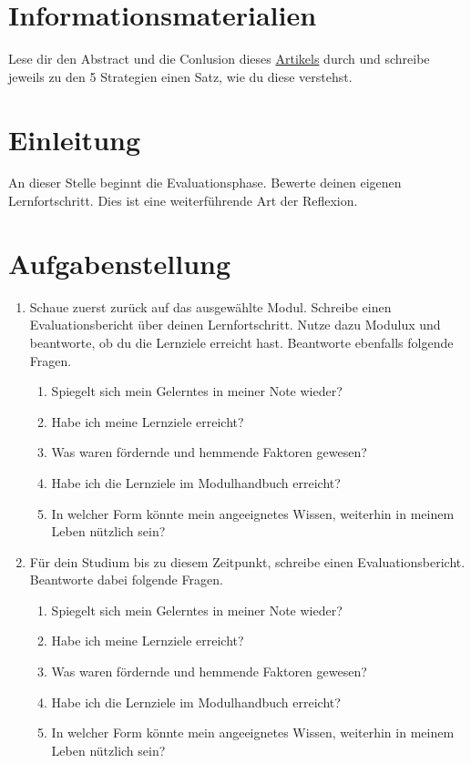 \documentclass[a4paper,oneside]{scrarticle}
\begin{document}
	\pagebreak 
	
	\section*{Informationsmaterialien}
	
	Lese dir den Abstract und die Conlusion dieses \href{https://sci-hub.ru/https://doi.org/10.1016/j.iheduc.2012.09.005}{Artikels}\cite{cheng_exploring_2013} durch und schreibe jeweils zu den 5 Strategien einen Satz, wie du diese verstehst.
	
	
	
	
	\pagebreak
	
	\section*{Einleitung}
	An dieser Stelle beginnt die Evaluationsphase. Bewerte deinen eigenen Lernfortschritt. Dies ist eine weiterführende Art der Reflexion. 
	
	\section*{Aufgabenstellung}

	\begin{enumerate}
		\item Schaue zuerst zurück auf das ausgewählte Modul. Schreibe einen Evaluationsbericht über deinen Lernfortschritt. Nutze dazu Modulux und beantworte, ob du die Lernziele erreicht hast. Beantworte ebenfalls folgende Fragen.
		\begin{enumerate}
			\item Spiegelt sich mein Gelerntes in meiner Note wieder?
			\item Habe ich meine Lernziele erreicht?
			\item Was waren fördernde und hemmende Faktoren gewesen?
			\item Habe ich die Lernziele im Modulhandbuch erreicht?
			\item In welcher Form könnte mein angeeignetes Wissen, weiterhin in meinem Leben nützlich sein?
		\end{enumerate}
		\item Für dein Studium bis zu diesem Zeitpunkt, schreibe einen Evaluationsbericht. Beantworte dabei folgende Fragen.
		\begin{enumerate}
			\item Spiegelt sich mein Gelerntes in meiner Note wieder?
			\item Habe ich meine Lernziele erreicht?
			\item Was waren fördernde und hemmende Faktoren gewesen?
			\item Habe ich die Lernziele im Modulhandbuch erreicht?
			\item In welcher Form könnte mein angeeignetes Wissen, weiterhin in meinem Leben nützlich sein?
		\end{enumerate}

	\end{enumerate}
\end{document}
